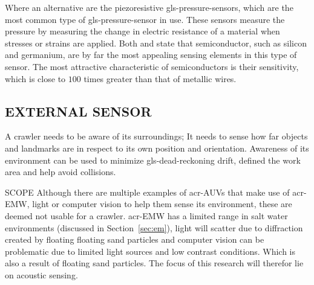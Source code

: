 Where an alternative are the piezoresistive \gls{gls-pressure-sensor}s, which are the most common type of
\gls{gls-pressure-sensor} in use. These sensors measure the pressure by measuring the change in electric resistance of a
material when stresses or strains are applied. Both \citet{webster_measurement_1999} and \citet{liptak_instrument_2003}
state that semiconductor, such as silicon and germanium, are by far the most appealing sensing elements in this type of
sensor. The most attractive characteristic of semiconductors is their sensitivity, which is close to \( 100 \) times
greater than that of metallic wires.

\subsection{EXTERNAL SENSOR}\label{sec:sensorenvironment}

A crawler needs to be aware of its surroundings; It needs to sense how far objects and landmarks are in respect to its
own position and orientation. Awareness of its environment can be used to minimize \gls{gls-dead-reckoning} drift,
defined the work area and help avoid collisions.

\begin{RoyalNote}{SCOPE}
    Although there are multiple examples of \gls{acr-AUV}s that make use of \gls{acr-EMW}, light or computer vision to
    help them sense its environment, these are deemed not usable for a crawler. \gls{acr-EMW} has a limited range in
    salt water environments (discussed in Section~\ref{sec:em}), light will scatter due to diffraction created by floating
    floating sand particles and computer vision can be problematic due to limited light sources and low contrast
    conditions. Which is also a result of floating sand particles. The focus of this research will therefor lie on
    acoustic sensing.
\end{RoyalNote}
